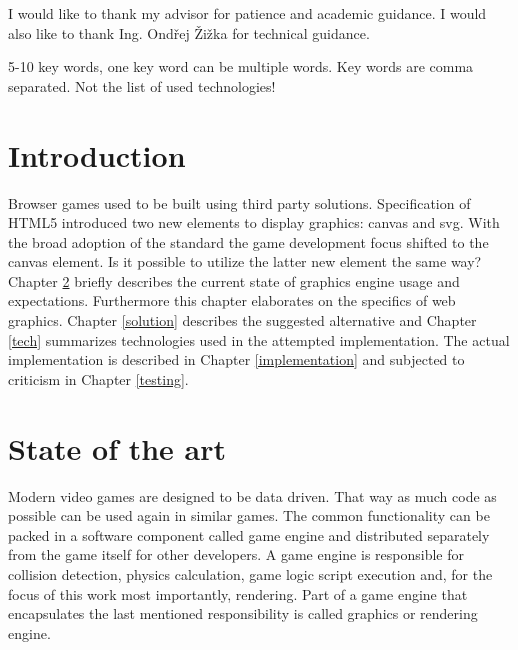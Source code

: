 \documentclass[11pt,oneside, final]{fithesis2}
\begin{document}
  
\FrontMatter  
\ThesisTitlePage  
 
\begin{ThesisDeclaration}  
\DeclarationText  
\AdvisorName  
\end{ThesisDeclaration}  
 
\begin{ThesisThanks}  
I would like to thank my advisor for patience and academic guidance. I would also like to thank Ing. Ondřej Žižka for technical guidance.
\end{ThesisThanks}  
 
\begin{ThesisAbstract}  

\end{ThesisAbstract}  
 
\begin{ThesisKeyWords}  
5-10 key words, one key word can be multiple words. Key words are comma separated. Not the list of used technologies!
\end{ThesisKeyWords}  
 
\MainMatter
 
\tableofcontents          %
 
\chapter{Introduction}
Browser games used to be built using third party solutions\cite{pagella}. Specification of HTML5 introduced two new elements to display graphics: canvas and svg\cite{w3_html5}. With the broad adoption of the standard the game development focus shifted to the canvas element\cite{pagella}. Is it possible to utilize the latter new element the same way? Chapter \ref{theory} briefly describes the current state of graphics engine usage and expectations. Furthermore this chapter elaborates on the specifics of web graphics. Chapter \ref{solution} describes the suggested alternative and Chapter \ref{tech} summarizes technologies used in the attempted implementation. The actual implementation is described in Chapter \ref{implementation} and subjected to criticism in Chapter \ref{testing}.

\chapter{State of the art}
\label{theory}

Modern video games are designed to be data driven. That way as much code as possible can be used again in similar games. The common functionality can be packed in a software component called game engine\cite{gregory} and distributed separately from the game itself for other developers. A game engine is responsible for collision detection, physics calculation, game logic script execution and, for the focus of this work most importantly, rendering. Part of a game engine that encapsulates the last mentioned responsibility is called graphics or rendering engine.
\end{document}
